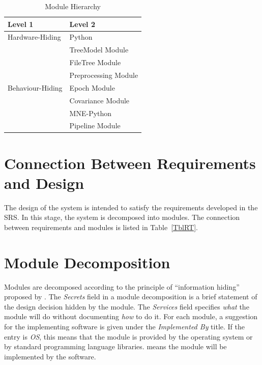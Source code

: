 \documentclass[12pt, titlepage]{article}
\begin{document}
\begin{table}[h!]
\centering
\begin{tabular}{p{} p{}}
\toprule
\textbf{Level 1} & \textbf{Level 2} \\
\midrule

{Hardware-Hiding}
    & Python \\
\midrule

\multirow{7}{0.3\textwidth}{Behaviour-Hiding}
    & TreeModel Module \\
    & FileTree Module \\
    & Preprocessing Module \\
    & Epoch Module \\
    & Covariance Module \\
    & MNE-Python \\
\midrule

\multirow{1}{0.3\textwidth}{Software Decision}
    & Pipeline Module \\

\bottomrule

\end{tabular}
\caption{Module Hierarchy}
\label{TblMH}
\end{table}








\section{Connection Between Requirements and Design} \label{SecConnection}


The design of the system is intended to satisfy the requirements developed in the SRS. In this stage, the system is decomposed into modules. The connection between requirements and modules is listed in Table~\ref{TblRT}.








\section{Module Decomposition} \label{SecMD}


Modules are decomposed according to the principle of ``information hiding'' proposed by \citet{ParnasEtAl1984}. The \emph{Secrets} field in a module decomposition is a brief statement of the design decision hidden by the module. The \emph{Services} field specifies \emph{what} the module will do without documenting \emph{how} to do it. For each module, a suggestion for the implementing software is given under the \emph{Implemented By} title. If the entry is \emph{OS}, this means that the module is provided by the operating system or by standard programming language libraries.  \emph{\progname{}} means the module will be implemented by the \progname{} software.
\end{document}
